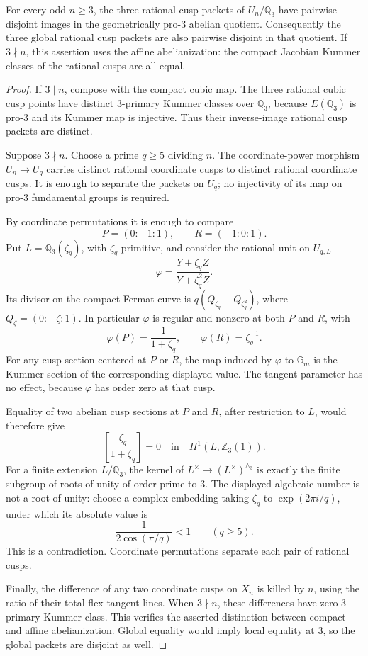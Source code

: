 \begin{proposition}
\label{prop:lm-affine-ab-cusp-separation}
For every odd $n\ge3$, the three rational cusp packets of
$U_n/\mathbb Q_3$ have pairwise disjoint images in the
geometrically pro-$3$ abelian quotient.
Consequently the three global rational cusp packets are
also pairwise disjoint in that quotient.
If $3\nmid n$, this assertion uses the affine
abelianization: the compact Jacobian Kummer classes of
the rational cusps are all equal.
\end{proposition}
\begin{proof}
If $3\mid n$, compose with the compact cubic map.
The three rational cubic cusp points have distinct
$3$-primary Kummer classes over $\mathbb Q_3$, because
$E(\mathbb Q_3)$ is pro-$3$ and its Kummer map is
injective.  Thus their inverse-image rational cusp
packets are distinct.

Suppose $3\nmid n$.  Choose a prime $q\ge5$ dividing $n$.
The coordinate-power morphism $U_n\to U_q$ carries
distinct rational coordinate cusps to distinct rational
coordinate cusps.  It is enough to separate the packets
on $U_q$; no injectivity of its map on pro-$3$
fundamental groups is required.

By coordinate permutations it is enough to compare
\[
 P=(0:-1:1),\qquad R=(-1:0:1).
\]
Put $L=\mathbb Q_3(\zeta_q)$, with $\zeta_q$ primitive,
and consider the rational unit on $U_{q,L}$
\[
 \varphi=\frac{Y+\zeta_q Z}{Y+\zeta_q^2 Z}.
\]
Its divisor on the compact Fermat curve is
$q(Q_{\zeta_q}-Q_{\zeta_q^2})$, where
$Q_\zeta=(0:-\zeta:1)$.  In particular $\varphi$
is regular and nonzero at both $P$ and $R$, with
\[
 \varphi(P)=\frac1{1+\zeta_q},
 \qquad
 \varphi(R)=\zeta_q^{-1}.
\]
For any cusp section centered at $P$ or $R$, the
map induced by $\varphi$ to $\mathbb G_m$ is the
Kummer section of the corresponding displayed
value.  The tangent parameter has no effect,
because $\varphi$ has order zero at that cusp.

Equality of two abelian cusp sections at $P$ and
$R$, after restriction to $L$, would therefore give
\[
 \left[\frac{\zeta_q}{1+\zeta_q}\right]=0
 \quad\text{in}\quad H^1(L,\mathbb Z_3(1)).
\]
For a finite extension $L/\mathbb Q_3$, the kernel
of $L^\times\to (L^\times)^{\wedge_3}$ is exactly
the finite subgroup of roots of unity of order
prime to $3$.  The displayed algebraic number is
not a root of unity: choose a complex embedding
taking $\zeta_q$ to $\exp(2\pi i/q)$, under which
its absolute value is
\[
 \frac1{2\cos(\pi/q)}<1
 \qquad(q\ge5).
\]
This is a contradiction.  Coordinate permutations
separate each pair of rational cusps.

Finally, the difference of any two coordinate
cusps on $X_n$ is killed by $n$, using the ratio
of their total-flex tangent lines.  When $3\nmid n$,
these differences have zero $3$-primary Kummer
class.  This verifies the asserted distinction
between compact and affine abelianization.
Global equality would imply local equality at
$3$, so the global packets are disjoint as well.
\end{proof}

